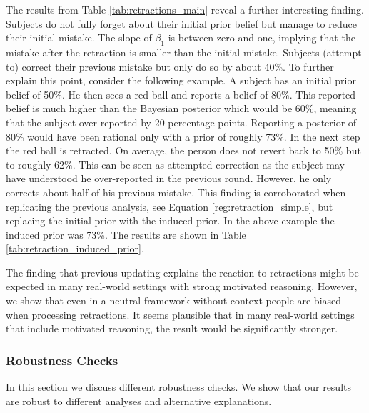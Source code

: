\documentclass{article}
\begin{document}
The results from Table \ref{tab:retractions_main} reveal a further interesting finding. Subjects do not fully forget about their initial prior belief but manage to reduce their initial mistake. The slope of $\beta_1$ is between zero and one, implying that the mistake after the retraction is smaller than the initial mistake. Subjects (attempt to) correct their previous mistake but only do so by about 40\%. To further explain this point, consider the following example. A subject has an initial prior belief of 50\%. He then sees a red ball and reports a belief of 80\%. This reported belief is much higher than the Bayesian posterior which would be 60\%, meaning that the subject over-reported by 20 percentage points. Reporting a posterior of 80\% would have been rational only with a prior of roughly 73\%. In the next step the red ball is retracted. On average, the person does not revert back to 50\% but to roughly 62\%. This can be seen as attempted correction as the subject may have understood he over-reported in the previous round. However, he only corrects about half of his previous mistake. This finding is corroborated when replicating the previous analysis, see Equation \ref{reg:retraction_simple}, but replacing the initial prior with the induced prior. In the above example the induced prior was 73\%. The results are shown in Table \ref{tab:retraction_induced_prior}.

The finding that previous updating explains the reaction to retractions might be expected in many real-world settings with strong motivated reasoning. However, we show that even in a neutral framework without context people are biased when processing retractions. It seems plausible that in many real-world settings that include motivated reasoning, the result would be significantly stronger.


\subsubsection{Robustness Checks} \label{sec:robustness_retractions}

In this section we discuss different robustness checks. We show that our results are robust to different analyses and alternative explanations.
\end{document}
